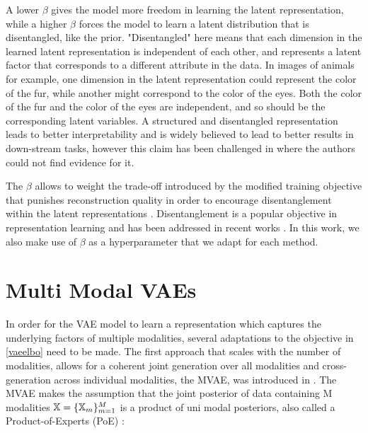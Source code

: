 A lower $\beta$ gives the model more freedom in learning the latent representation, while a higher $\beta$ forces the model to learn a latent distribution that is disentangled, like the prior.
"Disentangled" here means that each dimension in the learned latent representation is independent of each other, and represents a latent factor that corresponds to a different attribute in the data.
In images of animals for example, one dimension in the latent representation could represent the color of the fur, while another might correspond to the color of the eyes.
Both the color of the fur and the color of the eyes are independent, and so should be the corresponding latent variables.
A structured and disentangled representation leads to better interpretability and is widely believed to lead to better results in down-stream tasks, however this claim has been challenged in \citep{locatello_challenging_2019} where the authors could not find evidence for it.

The $\beta$ allows to weight the trade-off introduced by the modified training objective that punishes reconstruction quality in order to encourage disentanglement within the latent representations \citep{burgess_understanding_2018}.
Disentanglement is a popular objective in representation learning and has been addressed in recent works \parencite{chen_isolating_2019, locatello_challenging_2019}.
In this work, we also make use of $\beta$ as a hyperparameter that we adapt for each method.



\section{Multi Modal VAEs}
\label{subsec:Multi Modal VAEs}
In order for the VAE model to learn a representation which captures the underlying factors of multiple modalities, several adaptations to the objective in \cref{vaeelbo} need to be made.
The first approach that scales with the number of modalities, allows for a coherent joint generation over all modalities and cross-generation across individual modalities, the MVAE, was introduced in \citep{poe}.
The MVAE makes the assumption that the joint posterior of data containing M modalities $\mathbb{X} = \{ \mathbb{X} _m\}_{m=1}^M$ is a product of uni modal posteriors, also called a Product-of-Experts (PoE) \parencite{hinton_training_2002}:

